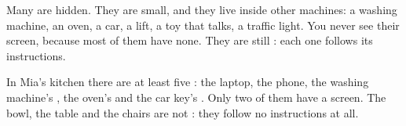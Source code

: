 Many  are hidden. They are small, and they live inside other
machines: a washing machine, an oven, a car, a lift, a toy that talks, a
traffic light. You never see their screen, because most of them have none.
They are still : each one follows its instructions.

\begin{example}\label{ex:g1:what-is-a-computer:kitchen}
In Mia's kitchen there are at least five : the laptop, the phone, the
washing machine's , the oven's  and the car key's .
Only two of them have a screen. The bowl, the table and the chairs are not
: they follow no instructions at all.
\end{example}

